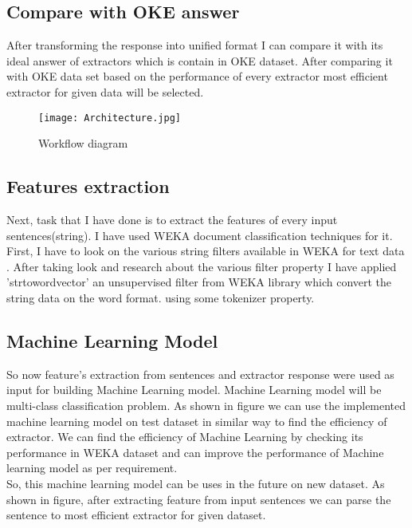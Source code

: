 \documentclass{llncs}
\begin{document}
\subsection{Compare with OKE answer}
After transforming the response into unified format I can compare it with its ideal answer of extractors which is contain in OKE dataset. After comparing it with OKE data set based on the performance of every extractor most efficient extractor for given data will be selected.
\begin{figure}
\texttt{[image: Architecture.jpg]}
\caption{Workflow diagram} 
\label{figure 1:}
\end{figure}
\subsection{Features extraction}
Next, task that I have done is to extract the features of every input sentences(string). I have used WEKA document classification techniques for it. First, I have to look on the various string filters available in WEKA for text data . After taking look and research about the  various filter property I have applied 'strtowordvector' an unsupervised filter from WEKA library which convert the string data on the word format. using some tokenizer property.
\subsection{Machine Learning Model}
So now feature’s extraction from sentences and extractor response were used as input for building Machine Learning model.  Machine Learning model will be multi-class classification problem.  As shown in figure we can use the implemented machine learning model on test dataset in similar way to find the efficiency of extractor. We can find the efficiency of Machine Learning by checking its performance in WEKA dataset and can improve the performance of Machine learning model as per requirement.\\
So, this machine learning model can be uses in the future on new dataset. As shown in figure, after extracting feature from input sentences we can parse the sentence to most efficient extractor for given dataset.
\end{document}
